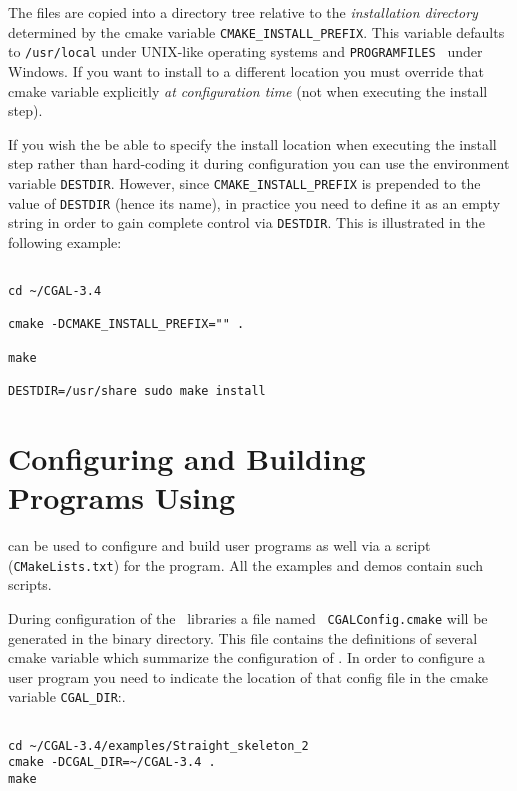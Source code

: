 The files are copied into a directory tree relative to the {\em installation directory} determined by the 
cmake variable \texttt{CMAKE\_INSTALL\_PREFIX}. This variable defaults to {\tt /usr/local} under UNIX-like operating systems
and {\tt PROGRAMFILES } under Windows. If you want to install to a different location you must override that cmake
variable explicitly {\em at configuration time} (not when executing the install step).

If you wish the be able to specify the install location when executing the install step rather than hard-coding it during
configuration you can use the environment variable \texttt{DESTDIR}. However, since \texttt{CMAKE\_INSTALL\_PREFIX} is prepended
to the value of \texttt{DESTDIR} (hence its name), in practice you need to define it as an empty string in order to gain complete
control via \texttt{DESTDIR}.
This is illustrated in the following example:

{\ccTexHtml{\scriptsize}{}
\begin{verbatim}

cd ~/CGAL-3.4

cmake -DCMAKE_INSTALL_PREFIX="" . 

make

DESTDIR=/usr/share sudo make install

\end{verbatim}
}



\section{Configuring and Building Programs Using \cgal}

\cmake can be used to configure and build user programs as well via a \cmake
script ({\tt CMakeLists.txt}) for the program.  All the examples and
demos contain such \cmake scripts.

During configuration of the \cgal\ libraries a file named {\tt
CGALConfig.cmake} will be generated in the binary directory. This file
contains the definitions of several cmake variable which summarize the
configuration of \cgal. In order to configure a user program you need
to indicate the location of that config file in the cmake variable
\texttt{CGAL\_DIR}:.

{\ccTexHtml{\scriptsize}{}
\begin{verbatim}

cd ~/CGAL-3.4/examples/Straight_skeleton_2
cmake -DCGAL_DIR=~/CGAL-3.4 .
make

\end{verbatim}
}

